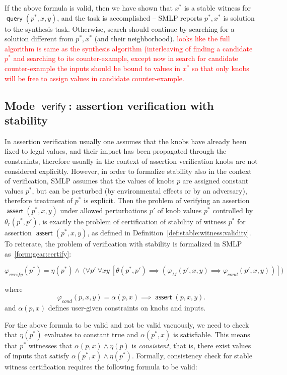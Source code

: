 \documentclass[a4paper,parskip=half]{article} %
\newcommand*\eqdef=
\newcommand*\query{\operatorname{\mathsf{query}}}
\newcommand*\assert{\operatorname{\mathsf{assert}}}
\newcommand*\mode[1]{\operatorname{\mathsf{#1}}} %
\newcommand\todozk[1]{\textcolor{red}{#1}}
\newcommand*\ZK{\todozk}
\begin{document}
If the above formula is valid, then we have shown that $x^*$ is a stable witness for  $\query(p^*, x, y)$, 
and the task is accomplished -- SMLP reports $p^*, x^*$ is solution to the synthesis task. Otherwise,
search should continue by searching for a solution different from $p^*, x^*$ (and their neighborhood).
\ZK{looks like the full algorithm is same as the synthesis algorithm (interleaving of finding a candidate $p^*$
and searching to its counter-example, except now in search for candidate counter-example the inputs should
be bound to values in $x^*$ so that only knobs will be free to assign values in candidate counter-example.}


\subsection{Mode $\mode{verify}$: assertion verification with stability}\label{sect:verify}


In assertion verification usually one assumes that the knobs have already been fixed to legal values, and their impact has been propagated 
through the constraints, therefore usually in the context of assertion verification knobs are not considered explicitly. However, in order 
to formalize stability also in the context of verification, SMLP assumes that the values of knobs $p$ are assigned constant values $p^*$, 
but can be perturbed (by environmental effects or by an adversary), therefore treatment of $p^*$ is explicit. Then the problem of 
verifying an assertion $\assert(p^*,x,y)$ under allowed perturbations $p'$ of knob values $p^*$ controlled by $\theta_r(p^*, p')$, 
is exactly the problem of certification of stability 
of witness $p^*$ for assertion $\assert(p^*,x,y)$, as defined in Definition~\ref{def:stable:witness:validity}. To reiterate, the problem of verification with stability is formalized in SMLP as~\cref{form:gear:certify}:


\begin{equation}\label{form:gear:certify}
\varphi_{\mathit{verify}}(p^*) \eqdef
     \eta(p^*) \wedge ~\big(
    \forall p'~
    \forall x y~[
   \theta(p^*, p') \implies (\varphi_M(p',x,y)  \implies  \varphi_{\mathit{cond}}(p',x,y))
    ]\big)
\end{equation}

where \[\varphi_{\mathit{cond}}(p,x,y) \eqdef \alpha(p,x) \implies \assert(p,x,y).\]
\noindent and  $\alpha(p,x)$ defines user-given constraints on knobs and inputs. 


For the above formula to be valid and not be valid vacuously, we need to check that $\eta(p^*)$ evaluates to constant true 
and  $\alpha(p^*,x)$ is satisfiable. This means that $p^*$ witnesses that $\alpha(p,x) \wedge \eta(p)$ is \emph{consistent}, 
that is, there exist values of inputs that satisfy  $\alpha(p^*,x) \wedge \eta(p^*)$. Formally, consistency check for stable 
witness certification requires the following formula to be valid: 
\end{document}
